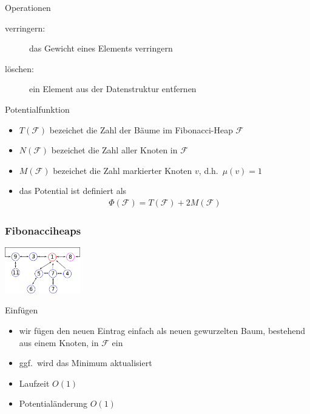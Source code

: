 \documentclass[aspectratio=1610, 11pt]{beamer}
\newcommand\cF{\mathcal F}
\newcommand{\mytitle}{Fibonacciheaps}
\begin{document}
\begin{frame}
\begin{overprint}
\begin{exampleblock}{Operationen}
\begin{description}
			\item[verringern:] das Gewicht eines Elements verringern
			\item[l\"oschen:] ein Element aus der Datenstruktur entfernen
		\end{description}
	\end{exampleblock}
\begin{exampleblock}{Potentialfunktion}
		\begin{itemize}
			\item $T(\cF)$ bezeichet die Zahl der B\"aume im Fibonacci-Heap $\cF$
			\item $N(\cF)$ bezeichet die Zahl aller Knoten in $\cF$ 
			\item $M(\cF)$ bezeichet die Zahl \alert{markierter Knoten} $v$, d.h.\ $\mu(v)=1$
			\item das \alert{Potential} ist definiert als
				\begin{align*}
					\Phi(\cF)=T(\cF)+2M(\cF)
				\end{align*}
		\end{itemize}
	\end{exampleblock}
	\end{overprint}
\end{frame}

\begin{frame}\frametitle{\mytitle}
	\hfill\includegraphics[height=20mm]{images/fibo2.pdf}
	\begin{overprint}
\begin{exampleblock}{Einf\"ugen}
		\begin{itemize}
			\item wir f\"ugen den neuen Eintrag einfach als neuen gewurzelten Baum, bestehend aus einem Knoten, in $\cF$ ein
			\item ggf.\ wird das Minimum aktualisiert
			\item Laufzeit $O(1)$
			\item Potential\"anderung $O(1)$
		\end{itemize}
	\end{exampleblock}	
	\end{overprint}
\end{frame}
\end{document}
